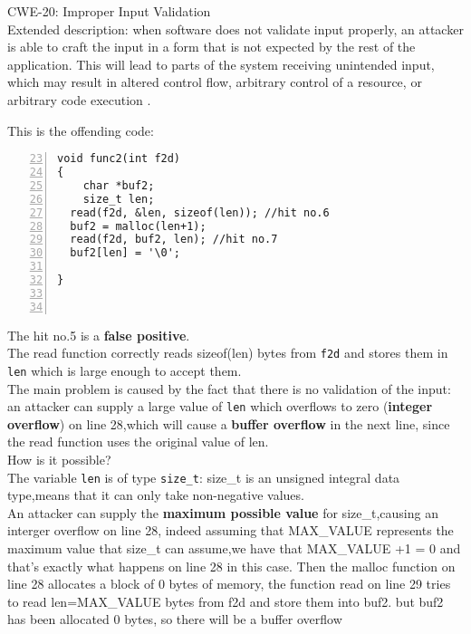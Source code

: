 \documentclass[a4paper,12pt]{article}
\newenvironment{SpecialPar}
  {\begin{shaded}}
  {\end{shaded}}
\begin{document}
\begin{SpecialPar}
\noindent
CWE-20: Improper Input Validation\\
Extended description: when software does not validate input properly, an attacker is able to craft the input in a form that is not expected by the rest of the application. This will lead to parts of the system receiving unintended input, which may result in altered control flow, arbitrary control of a resource, or arbitrary code execution \cite{CWE20}.
\end{SpecialPar}
\noindent
This is the offending code:
\begin{lstlisting}[style=c,numbers=left,firstnumber=23,linebackgroundcolor={
\ifnum\value{lstnumber}=27\color{green}\fi
\ifnum\value{lstnumber}=28\color{red}\fi
\ifnum\value{lstnumber}=29\color{red}\fi}]
void func2(int f2d)
{
	char *buf2;
	size_t len;
  read(f2d, &len, sizeof(len)); //hit no.6
  buf2 = malloc(len+1); 
  read(f2d, buf2, len); //hit no.7
  buf2[len] = '\0';

}



\end{lstlisting}
The hit no.5 is a \textbf{false positive}.\\
The read function correctly reads sizeof(len) bytes from \texttt{f2d} and stores them in \texttt{len} which is large enough to accept them.\\
The main problem is caused by the fact that there is no validation of the input: an attacker can supply a large value of \texttt{len} which 
overflows to zero (\textbf{integer overflow}) on line 28,which will cause a \textbf{buffer overflow} in the next line, since the read function uses the original value of len.\\
How is it possible?\\
The variable \texttt{len} is of type \texttt{size\_t}: size\_t is an unsigned integral data type,means that it can only take non-negative values.\\
An attacker can supply the \textbf{maximum possible value} for size\_t,causing an interger overflow on line 28, indeed assuming that MAX\_VALUE represents the maximum value that size\_t can assume,we have that MAX\_VALUE +1 = 0 and that's exactly what happens on line 28 in this case.
Then the malloc function on line 28 allocates a block of 0 bytes of memory, the function read on line 29 tries to read len=MAX\_VALUE bytes from f2d and store them into buf2. 
but buf2 has been allocated 0 bytes, so there will be a buffer overflow
\end{document}
